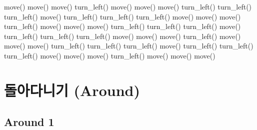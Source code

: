 \documentclass[
  b5paperpaper,
  DIV=11,
  numbers=noendperiod]{scrreprt}
\newenvironment{Shaded}{\begin{snugshade}}{\end{snugshade}}
\newcommand{\FunctionTok}[1]{\textcolor[rgb]{0.28,0.35,0.67}{#1}}
\newcommand{\NormalTok}[1]{\textcolor[rgb]{0.00,0.23,0.31}{#1}}
\begin{document}
\begin{Shaded}
\begin{Highlighting}[]
\FunctionTok{move}\NormalTok{()}
\FunctionTok{move}\NormalTok{()}
\FunctionTok{move}\NormalTok{()}
\FunctionTok{turn\_left}\NormalTok{()}
\FunctionTok{move}\NormalTok{()}
\FunctionTok{move}\NormalTok{()}
\FunctionTok{move}\NormalTok{()}
\FunctionTok{turn\_left}\NormalTok{()}
\FunctionTok{turn\_left}\NormalTok{()}
\FunctionTok{turn\_left}\NormalTok{()}
\FunctionTok{move}\NormalTok{()}
\FunctionTok{turn\_left}\NormalTok{()}
\FunctionTok{turn\_left}\NormalTok{()}
\FunctionTok{turn\_left}\NormalTok{()}
\FunctionTok{move}\NormalTok{()}
\FunctionTok{move}\NormalTok{()}
\FunctionTok{move}\NormalTok{()}
\FunctionTok{turn\_left}\NormalTok{()}
\FunctionTok{move}\NormalTok{()}
\FunctionTok{move}\NormalTok{()}
\FunctionTok{move}\NormalTok{()}
\FunctionTok{turn\_left}\NormalTok{()}
\FunctionTok{turn\_left}\NormalTok{()}
\FunctionTok{turn\_left}\NormalTok{()}
\FunctionTok{move}\NormalTok{()}
\FunctionTok{turn\_left}\NormalTok{()}
\FunctionTok{turn\_left}\NormalTok{()}
\FunctionTok{turn\_left}\NormalTok{()}
\FunctionTok{move}\NormalTok{()}
\FunctionTok{move}\NormalTok{()}
\FunctionTok{move}\NormalTok{()}
\FunctionTok{turn\_left}\NormalTok{()}
\FunctionTok{move}\NormalTok{()}
\FunctionTok{move}\NormalTok{()}
\FunctionTok{move}\NormalTok{()}
\FunctionTok{turn\_left}\NormalTok{()}
\FunctionTok{turn\_left}\NormalTok{()}
\FunctionTok{turn\_left}\NormalTok{()}
\FunctionTok{move}\NormalTok{()}
\FunctionTok{turn\_left}\NormalTok{()}
\FunctionTok{turn\_left}\NormalTok{()}
\FunctionTok{turn\_left}\NormalTok{()}
\FunctionTok{move}\NormalTok{()}
\FunctionTok{move}\NormalTok{()}
\FunctionTok{move}\NormalTok{()}
\FunctionTok{turn\_left}\NormalTok{()}
\FunctionTok{move}\NormalTok{()}
\FunctionTok{move}\NormalTok{()}
\FunctionTok{move}\NormalTok{()}
\end{Highlighting}
\end{Shaded}

\hypertarget{around}{%
\chapter{돌아다니기 (Around)}\label{around}}

\hypertarget{around-01}{%
\section{Around 1}\label{around-01}}
\end{document}
